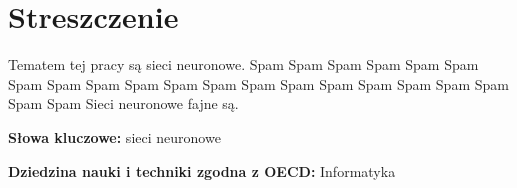 \section*{Streszczenie}

  \tab Tematem tej pracy są sieci neuronowe. Spam Spam Spam Spam Spam Spam
  Spam Spam Spam  Spam Spam Spam  Spam Spam Spam  Spam Spam Spam  Spam Spam Spam
  \newline
  \tab Sieci neuronowe fajne są.

  \bigskip

  \noindent\textbf{Słowa kluczowe:} sieci neuronowe

  \bigskip

  \noindent\textbf{Dziedzina nauki i techniki zgodna z OECD:} Informatyka
